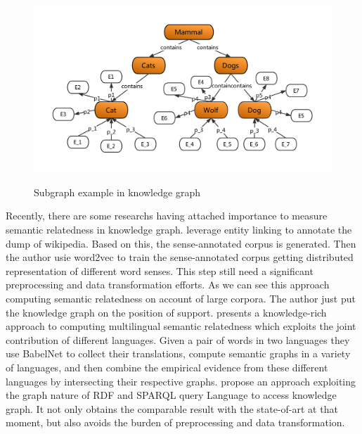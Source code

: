 \begin{figure}
    \centering
    \includegraphics[width=1.0\textwidth]{pic/weak1.pdf}\\
    \caption{Subgraph example in knowledge graph}
    \label{weak1}
\end{figure}

Recently, there are some researchs having attached importance to measure semantic relatedness
in knowledge graph\cite{aaai/Pirro12, aaai/NavigliP12, acl/IacobacciPN15}. 
\cite{acl/IacobacciPN15} leverage entity linking to annotate the dump of wikipedia. Based on this,
the sense-annotated corpus is generated. Then the author usie word2vec to
train the sense-annotated corpus getting distributed representation of different 
word senses. This step still need a significant preprocessing and data transformation efforts. 
As we can see this approach computing semantic relatedness on account of large corpora.
The author just put the knowledge graph on the position of support. 
\cite{aaai/NavigliP12} presents a knowledge-rich approach to computing multilingual semantic
relatedness which exploits the joint contribution of different languages. Given a pair of words 
in two languages they use BabelNet to collect their translations, compute semantic
graphs in a variety of languages, and then combine the empirical evidence from these 
different languages by intersecting their respective graphs.
\cite{aaai/Pirro12} propose an approach exploiting the graph nature of RDF and SPARQL query
Language to access knowledge graph. It not only obtains the comparable
result with the state-of-art at that moment, but also avoids the burden
of preprocessing and data transformation.




